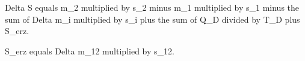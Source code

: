 Delta S equals m_2 multiplied by s_2 minus m_1 multiplied by s_1 minus the sum of Delta m_i multiplied by s_i plus the sum of Q_D divided by T_D plus S_erz.  

S_erz equals Delta m_12 multiplied by s_12.